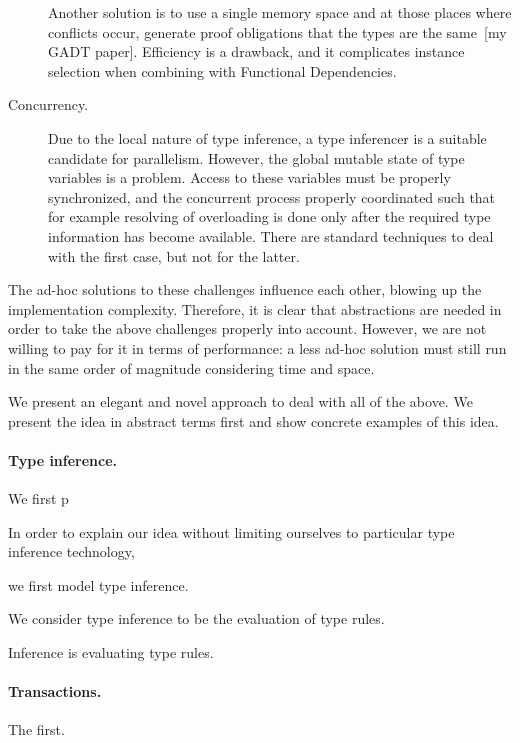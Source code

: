 \documentclass[preprint,natbib]{sigplanconf}
\begin{document}
\begin{description}
    Another solution is to use a single memory space and at those places where
    conflicts occur, generate proof obligations that the types are the
    same~[my GADT paper]. Efficiency is a drawback, and it complicates
    instance selection when combining with Functional Dependencies.
  \item[Concurrency.]
    Due to the local nature of type inference, a type inferencer is a suitable
    candidate for parallelism. However, the global mutable state of type
    variables is a problem. Access to these variables must be properly
    synchronized, and the concurrent process properly coordinated such that
    for example resolving of overloading is done only after the required
    type information has become available. There are standard techniques
    to deal with the first case, but not for the latter.
  \end{description}

  The ad-hoc solutions to these challenges influence each other, blowing up the
  implementation complexity. Therefore, it is clear that abstractions are needed
  in order to take the above challenges properly into account. However, we are
  not willing to pay for it in terms of performance: a less ad-hoc solution
  must still run in the same order of magnitude considering time and space.

  We present an elegant and novel approach to deal with all of the above. We
  present the idea in abstract terms first and show concrete examples of this
  idea.
  
  \paragraph{Type inference.}
  We first p
  
  In order to explain our idea without limiting ourselves to particular type
  inference technology, 
  
  we first model type inference.
  
  We consider type inference to be the evaluation of type rules.
  
  
  Inference is evaluating type rules.
  
  
  \paragraph{Transactions.}
  The first.
  
\end{document}
